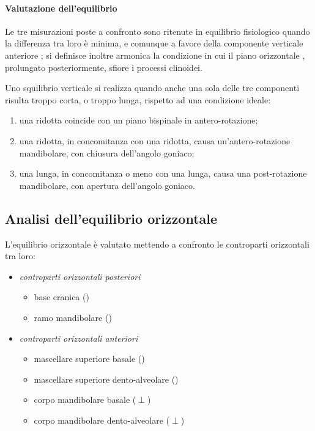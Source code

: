 \paragraph{Valutazione dell'equilibrio}
Le tre misurazioni poste a confronto sono ritenute in equilibrio fisiologico quando la differenza tra loro è minima, e comunque a favore della componente verticale anteriore ; si definisce inoltre armonica la condizione in cui il piano orizzontale , prolungato posteriormente, sfiore i processi clinoidei.

Uno squilibrio verticale si realizza quando anche una sola delle tre componenti risulta troppo corta, o troppo lunga, rispetto ad una condizione ideale:

\begin{enumerate}
\item una  ridotta coincide con un piano bispinale in antero-rotazione;
\item una  ridotta, in concomitanza con una  ridotta, causa un'antero-rotazione mandibolare, con chiusura dell'angolo goniaco;
\item una  lunga, in concomitanza o meno con una  lunga, causa una post-rotazione mandibolare, con apertura dell'angolo goniaco.
\end{enumerate}

\subsection*{Analisi dell'equilibrio orizzontale}
L'equilibrio orizzontale è valutato mettendo a confronto le controparti orizzontali tra loro:
\begin{itemize}
\item \textit{controparti orizzontali posteriori}
\begin{itemize}
\item base cranica ()
\item ramo mandibolare ()
\end{itemize}
\item \textit{controparti orizzontali anteriori}
\begin{itemize}
\item mascellare superiore basale ()
\item mascellare superiore dento-alveolare ()
\item corpo mandibolare basale ($\perp$)
\item corpo mandibolare dento-alveolare ($\perp$)
\end{itemize}
\end{itemize}


